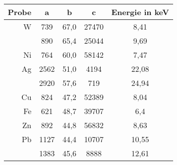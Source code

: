 \begin{tabular}{rcccc}
\toprule
Probe&a&b&c&Energie in keV\\
\midrule
W&739&67,0&27470&8,41\\
&890&65,4&25044&9,69\\
Ni&764&60,0&58142&7,47\\
Ag&2562&51,0&4194&22,08\\
&2920&57,6&719&24,94\\
Cu&824&47,2&52389&8,04\\
Fe&621&48,7&39707&6,4\\
Zn&892&44,8&56832&8,63\\
Pb&1127&44,4&10707&10,55\\
&1383&45,6&8888&12,61\\
\bottomrule
\end{tabular}